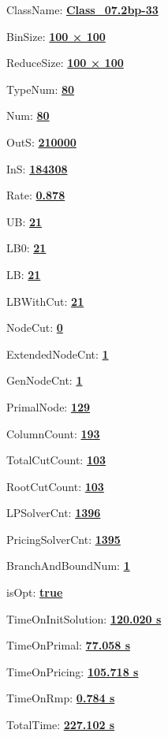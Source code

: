 \documentclass[11pt]{article}
\begin{document}
\pagestyle{empty}


ClassName: \underline{\textbf{Class_07.2bp-33}}
\par
BinSize: \underline{\textbf{100 × 100}}
\par
ReduceSize: \underline{\textbf{100 × 100}}
\par
TypeNum: \underline{\textbf{80}}
\par
Num: \underline{\textbf{80}}
\par
OutS: \underline{\textbf{210000}}
\par
InS: \underline{\textbf{184308}}
\par
Rate: \underline{\textbf{0.878}}
\par
UB: \underline{\textbf{21}}
\par
LB0: \underline{\textbf{21}}
\par
LB: \underline{\textbf{21}}
\par
LBWithCut: \underline{\textbf{21}}
\par
NodeCut: \underline{\textbf{0}}
\par
ExtendedNodeCnt: \underline{\textbf{1}}
\par
GenNodeCnt: \underline{\textbf{1}}
\par
PrimalNode: \underline{\textbf{129}}
\par
ColumnCount: \underline{\textbf{193}}
\par
TotalCutCount: \underline{\textbf{103}}
\par
RootCutCount: \underline{\textbf{103}}
\par
LPSolverCnt: \underline{\textbf{1396}}
\par
PricingSolverCnt: \underline{\textbf{1395}}
\par
BranchAndBoundNum: \underline{\textbf{1}}
\par
isOpt: \underline{\textbf{true}}
\par
TimeOnInitSolution: \underline{\textbf{120.020 s}}
\par
TimeOnPrimal: \underline{\textbf{77.058 s}}
\par
TimeOnPricing: \underline{\textbf{105.718 s}}
\par
TimeOnRmp: \underline{\textbf{0.784 s}}
\par
TotalTime: \underline{\textbf{227.102 s}}
\par
\newpage


\end{document}
